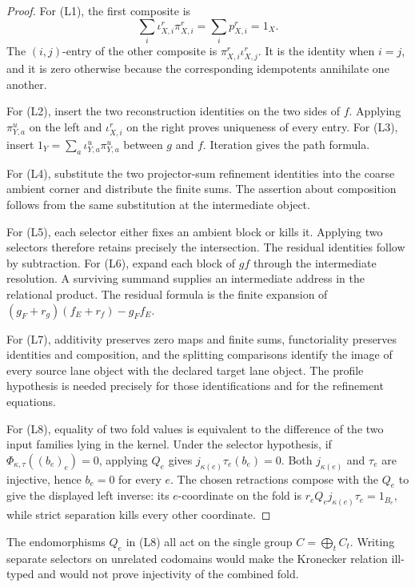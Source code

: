 \begin{proof}
For (L1), the first composite is
\[
 \sum_i\iota_{X,i}^r\pi_{X,i}^r
 =\sum_i p_{X,i}^r=1_X.
\]
The \((i,j)\)-entry of the other composite is
\(\pi_{X,i}^r\iota_{X,j}^r\).  It is the identity when \(i=j\), and it is
zero otherwise because the corresponding idempotents annihilate one another.

For (L2), insert the two reconstruction identities on the two sides of
\(f\).  Applying \(\pi_{Y,a}^u\) on the left and
\(\iota_{X,i}^r\) on the right proves uniqueness of every entry.  For (L3),
insert
\(1_Y=\sum_a\iota_{Y,a}^u\pi_{Y,a}^u\) between \(g\) and \(f\).
Iteration gives the path formula.

For (L4), substitute the two projector-sum refinement identities into the
coarse ambient corner and distribute the finite sums.  The assertion about
composition follows from the same substitution at the intermediate object.

For (L5), each selector either fixes an ambient block or kills it.  Applying
two selectors therefore retains precisely the intersection.  The residual
identities follow by subtraction.  For (L6), expand each block of \(gf\)
through the intermediate resolution.  A surviving summand supplies an
intermediate address in the relational product.  The residual formula is the
finite expansion of
\((g_F+r_g)(f_E+r_f)-g_Ff_E\).

For (L7), additivity preserves zero maps and finite sums, functoriality
preserves identities and composition, and the splitting comparisons identify
the image of every source lane object with the declared target lane object.
The profile hypothesis is needed precisely for those identifications and for
the refinement equations.

For (L8), equality of two fold values is equivalent to the difference of the
two input families lying in the kernel.  Under the selector hypothesis, if
\(\Phi_{\kappa,\tau}((b_e)_e)=0\), applying \(Q_e\) gives
\(j_{\kappa(e)}\tau_e(b_e)=0\).  Both \(j_{\kappa(e)}\) and \(\tau_e\) are
injective, hence \(b_e=0\) for every \(e\).  The chosen retractions compose
with the \(Q_e\) to give the displayed left inverse: its \(e\)-coordinate
on the fold is \(r_eQ_ej_{\kappa(e)}\tau_e=1_{B_e}\), while strict
separation kills every other coordinate.
\end{proof}

\begin{remark}
\label{rem:block15-global-fold-typing}
The endomorphisms \(Q_e\) in (L8) all act on the single group
\(C=\bigoplus_tC_t\).  Writing separate selectors on unrelated codomains
would make the Kronecker relation ill-typed and would not prove injectivity of
the combined fold.
\end{remark}

